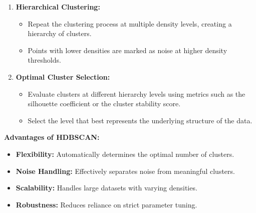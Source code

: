 \documentclass[12pt,a4paper]{article}
\begin{document}
\begin{enumerate}
    \item \textbf{Hierarchical Clustering:}
    \begin{itemize}
        \item Repeat the clustering process at multiple density levels, creating a hierarchy of clusters.
        \item Points with lower densities are marked as noise at higher density thresholds.
    \end{itemize}
    
    \item \textbf{Optimal Cluster Selection:}
    \begin{itemize}
        \item Evaluate clusters at different hierarchy levels using metrics such as the silhouette coefficient or the cluster stability score.
        \item Select the level that best represents the underlying structure of the data.
    \end{itemize}
\end{enumerate}

\textbf{Advantages of HDBSCAN:}
\begin{itemize}
    \item \textbf{Flexibility:} Automatically determines the optimal number of clusters.
    \item \textbf{Noise Handling:} Effectively separates noise from meaningful clusters.
    \item \textbf{Scalability:} Handles large datasets with varying densities.
    \item \textbf{Robustness:} Reduces reliance on strict parameter tuning.
\end{itemize}
\end{document}

